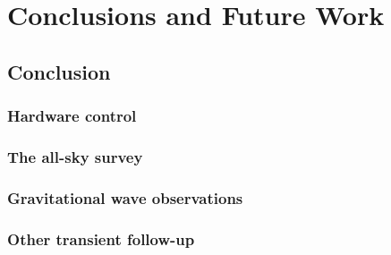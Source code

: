 \chapter{Conclusions and Future Work}
\label{chap:conclusion}
\chaptoc{}


\newpage
\section{Conclusion}
\label{sec:conclusion}
\begin{colsection}


\begin{colsection}


\end{colsection}


\subsection{Hardware control}
\label{sec:hardware_results}
\begin{colsection}


\end{colsection}


\subsection{The all-sky survey}
\label{sec:survey_results}
\begin{colsection}


\end{colsection}


\subsection{Gravitational wave observations}
\label{sec:gw_results}
\begin{colsection}


\end{colsection}


\subsection{Other transient follow-up}
\label{sec:other_results}
\begin{colsection}


\end{colsection}


\end{colsection}

